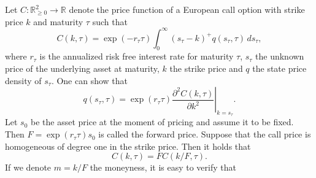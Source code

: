 Let $C: \mathbb{R}_{\geq 0}^{2}\rightarrow \mathbb{R}$ denote the price function of a European call option with strike price $k$ and maturity $\tau$ such that
\begin{equation}\label{c:c2}
C(k,\tau) = \exp{(-r_{\tau}\tau)}\int_0^\infty(s_{\tau}-k)^{+} q(s_{\tau},\tau) \,ds_{\tau},
\end{equation}
where $r_{\tau}$ is the annualized risk free interest rate for maturity $\tau$, $s_{\tau}$ the unknown price of the underlying asset at maturity, $k$ the strike price and $q$ the state price density of $s_{\tau}$. %
One can show that 
 \begin{equation}\label{q09}
    q(s_{\tau},\tau) =\exp{(r_{\tau}\tau)}\left. \frac{\partial^2 C(k,\tau)}{\partial k^2} \right|_{k=s_{\tau}}.
\end{equation}
Let $s_0$ be the asset price at the moment of pricing and assume it to be fixed. Then $F=\exp(r_{\tau}\tau)s_0$ is called the forward price. Suppose that the call price is homogeneous of degree one in the strike price. Then it holds that
\begin{equation}\label{q10}
C( k,\tau) = F C(k/F,\tau).
\end{equation}
If we denote $m=k/F$ the moneyness, it is easy to verify that 

